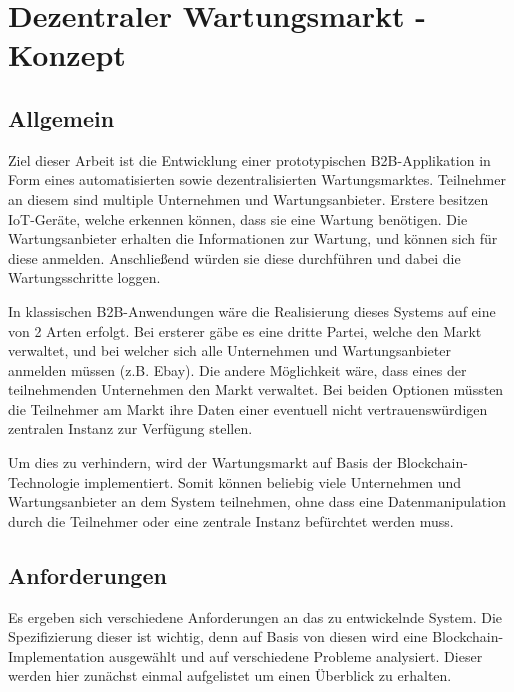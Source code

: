 \chapter{Dezentraler Wartungsmarkt - Konzept}
\label{cha:fazit}

\section{Allgemein}
Ziel dieser Arbeit ist die Entwicklung einer prototypischen B2B-Applikation in Form eines automatisierten sowie dezentralisierten Wartungsmarktes. Teilnehmer an diesem sind multiple Unternehmen und Wartungsanbieter. Erstere besitzen IoT-Geräte, welche erkennen können, dass sie eine Wartung benötigen. Die Wartungsanbieter erhalten die Informationen zur Wartung, und können sich für diese anmelden. Anschließend würden sie diese durchführen und dabei die Wartungsschritte loggen.  

In klassischen B2B-Anwendungen wäre die Realisierung dieses Systems auf eine von 2 Arten erfolgt. Bei ersterer gäbe es eine dritte Partei, welche den Markt verwaltet, und bei welcher sich alle Unternehmen und Wartungsanbieter anmelden müssen (z.B. Ebay). Die andere Möglichkeit wäre, dass eines der teilnehmenden Unternehmen den Markt verwaltet. Bei beiden Optionen müssten die Teilnehmer am Markt ihre Daten einer eventuell nicht vertrauenswürdigen zentralen Instanz zur Verfügung stellen.

Um dies zu verhindern, wird der Wartungsmarkt auf Basis der Blockchain-Technologie implementiert. Somit können beliebig viele Unternehmen und Wartungsanbieter an dem System teilnehmen, ohne dass eine Datenmanipulation durch die Teilnehmer oder eine zentrale Instanz befürchtet werden muss.


\section{Anforderungen}
Es ergeben sich verschiedene Anforderungen an das zu entwickelnde System. Die Spezifizierung dieser ist wichtig, denn auf Basis von diesen wird eine Blockchain-Implementation ausgewählt und auf verschiedene Probleme analysiert. Dieser werden hier zunächst einmal aufgelistet um einen Überblick zu erhalten.

